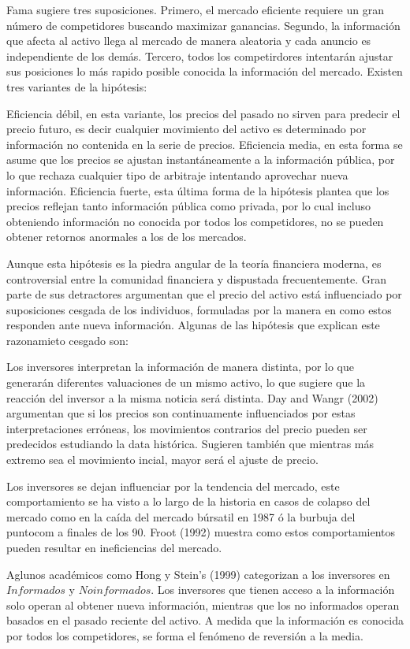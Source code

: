 \documentclass[a4paper,12pt]{Latex/Classes/PhDthesisPSnPDF}
\begin{document}
Fama sugiere tres suposiciones. Primero, el mercado eficiente requiere un gran número de competidores buscando maximizar ganancias. Segundo, la información que afecta al activo llega al mercado de manera aleatoria y cada anuncio es independiente de los demás. Tercero, todos los competirdores intentarán ajustar sus posiciones lo más rapido posible conocida la información del mercado. Existen tres variantes de la hipótesis:

Eficiencia débil, en esta variante, los precios del pasado no sirven para predecir el precio futuro, es decir cualquier movimiento del activo es determinado por información no contenida en la serie de precios. Eficiencia media, en esta forma se asume que los precios se ajustan instantáneamente a la información pública, por lo que rechaza cualquier tipo de arbitraje intentando aprovechar nueva información. Eficiencia fuerte, esta última forma de la hipótesis plantea que los precios reflejan tanto información pública como privada, por lo cual incluso obteniendo información no conocida por todos los competidores, no se pueden obtener retornos anormales a los de los mercados.

Aunque esta hipótesis es la piedra angular de la teoría financiera moderna, es controversial entre la comunidad financiera y dispustada frecuentemente. Gran parte de sus detractores argumentan que el precio del activo está influenciado por suposiciones cesgada de los individuos, formuladas por la manera en como estos responden ante nueva información. Algunas de las hipótesis que explican este razonamieto cesgado son: 

Los inversores interpretan la información de manera distinta, por lo que generarán diferentes valuaciones de un mismo activo, lo que sugiere que la reacción del inversor a la misma noticia será distinta. Day and Wangr (2002) argumentan que si los precios son continuamente influenciados por estas interpretaciones erróneas, los movimientos contrarios del precio pueden ser predecidos estudiando la data histórica. Sugieren también que mientras más extremo sea el movimiento incial, mayor será el ajuste de precio.

Los inversores se dejan influenciar por la tendencia del mercado, este comportamiento se ha visto a lo largo de la historia en casos de colapso del mercado como en la caída del mercado búrsatil en 1987 ó la burbuja del puntocom a finales de los 90. Froot (1992) muestra como estos comportamientos pueden resultar en ineficiencias del mercado.

Aglunos académicos como Hong y Stein's (1999) categorizan a los inversores en $Informados$ y $No informados$. Los inversores que tienen acceso a la información solo operan al obtener nueva información, mientras que los no informados operan basados en el pasado reciente del activo. A medida que la información es conocida por todos los competidores, se forma el fenómeno de reversión a la media.
\end{document}
